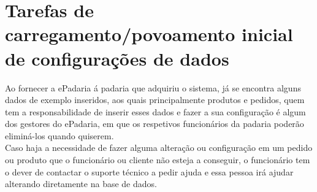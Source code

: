 \section{Tarefas de carregamento/povoamento inicial de configurações de dados}
Ao fornecer a ePadaria á padaria que adquiriu o sistema, já se encontra alguns dados de exemplo inseridos, aos quais principalmente produtos e pedidos, quem tem a responsabilidade de inserir esses dados e fazer a sua configuração é algum dos gestores do ePadaria, em que os respetivos funcionários da padaria poderão eliminá-los quando quiserem. \\
Caso haja a necessidade de fazer alguma alteração ou configuração em um pedido ou produto que o funcionário ou cliente não esteja a conseguir, o funcionário tem o dever de contactar o suporte técnico a pedir ajuda e essa pessoa irá ajudar alterando diretamente na base de dados.

